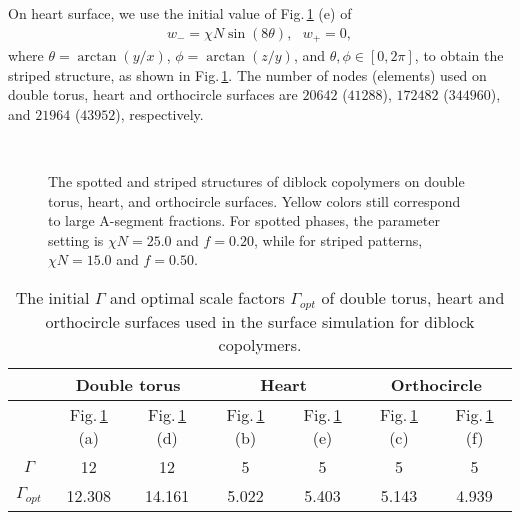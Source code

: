 \documentclass[final,1p,times]{elsarticle}
\begin{document}
On heart surface, we use the initial value of Fig.\,\ref{fig:othersurface} (e) of 
\begin{align*}
    w_{-} = \chi N\sin(8\theta), ~~~w_{+} = 0,
\end{align*}
where $\theta = \arctan(y/x)$, $\phi = \arctan(z/y)$, and $\theta, \phi \in [0,
2\pi]$, to obtain the striped structure, as shown in
Fig.\,\ref{fig:othersurface}.  The number of nodes (elements) used on double
torus, heart and orthocircle surfaces are $20642$ ($41288$), $172482$
($344960$), and $21964$ ($43952$), respectively.


\begin{figure}[H]
\setlength{\captionmargin}{2pt}
\centering
{}
    \hspace{0.5cm}
\hspace{0.5cm}
\\
\hspace{0.5cm}
\hspace{0.5cm}
\caption{
    The spotted and striped structures of diblock copolymers on double torus,
    heart, and orthocircle surfaces. Yellow colors still correspond to large
    A-segment fractions.  For spotted phases, the parameter setting is $\chi
    N=25.0$ and $f=0.20$, while for striped patterns, $\chi N=15.0$ and
    $f=0.50$.
}
\label{fig:othersurface}
\end{figure}


\begin{table}[H]
	\caption{The initial $\Gamma$ and optimal scale factors $\Gamma_{opt}$ of 
	double torus, heart and orthocircle surfaces used in the
	surface simulation for diblock copolymers.}
  \label{tab:general:radius}
  \centering
\begin{tabular}{|c|c|c|c|c|c|c|}
 \hline
 & \multicolumn{2}{c}{Double torus} \vline & \multicolumn{2}{c}{Heart}
  \vline &\multicolumn{2}{c}{Orthocircle} \vline
 \\ \hline
    & Fig.\,\ref{fig:othersurface} (a) & Fig.\,\ref{fig:othersurface} (d) &
    Fig.\,\ref{fig:othersurface} (b) & Fig.\,\ref{fig:othersurface} (e) &
    Fig.\,\ref{fig:othersurface} (c) & Fig.\,\ref{fig:othersurface} (f)
 \\ \hline
    $\Gamma$ & 12 & 12 & 5 & 5 & 5 & 5 
    \\ \hline
    $\Gamma_{opt}$ &  12.308  & 14.161 & 5.022  & 5.403   & 5.143 & 4.939
 \\ \hline
\end{tabular}
\end{table}
\end{document}
